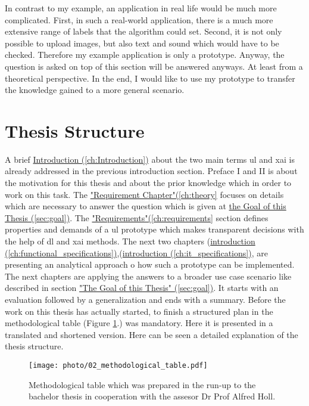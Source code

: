 In contrast to my example, an application in real life would be much more complicated. First, in such a real-world application, there is a much more extensive range of labels that the algorithm could set. Second, it is not only possible to upload images, but also text and sound which would have to be checked. Therefore my example application is only a prototype. Anyway, the question is asked on top of this section will be answered anyways. At least from a theoretical perspective. In the end, I would like to use my prototype to transfer the knowledge gained to a more general scenario.

\section{Thesis Structure}
\label{sec:structure}

A brief \hyperref[ch:Introduction]{Introduction (\ref{ch:Introduction})} about the two main terms \gls{ul} and \gls{xai} is already addressed in the previous introduction section. Preface I and II is about the motivation for this thesis and about the prior knowledge which in order to work on this task. The \hyperref[ch:theory]{"Requirement Chapter"(\ref{ch:theory}} focuses on details which are necessary to answer the question which is given at \hyperref[sec:goal]{the Goal of this Thesis (\ref{sec:goal})}. The \hyperref[ch:requirements]{"Requirements"(\ref{ch:requirements}} section defines properties and demands of a \gls{ul} prototype which makes transparent decisions with the help of \gls{dl} and \gls{xai} methods. The next two chapters (\hyperref[ch:functional_specifications]{introduction (\ref{ch:functional_specifications})},(\hyperref[ch:it_specifications]{introduction (\ref{ch:it_specifications})}, are presenting an analytical approach o how such a prototype can be implemented. The next chapters are applying the answers to a broader use case scenario like described in section \hyperref[sec:goal]{"The Goal of this Thesis" (\ref{sec:goal})}. It starts with an evaluation followed by a generalization and ends with a summary. Before the work on this thesis has actually started, to finish a structured plan in the methodological table (Figure \ref{fig:02_methodological_table}.) was mandatory. Here it is presented in a translated and shortened version. Here can be seen a detailed explanation of the thesis structure. 

\begin{figure}[htp]
\centering
    \texttt{[image: photo/02\_methodological\_table.pdf]}%
    \caption{Methodological table  which was prepared in the run-up to the bachelor thesis in cooperation with the assesor Dr Prof Alfred Holl.}
    \label{fig:02_methodological_table}
\end{figure}

